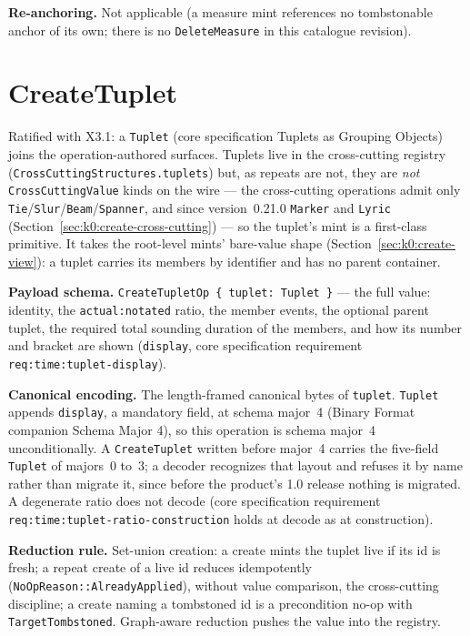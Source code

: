 \documentclass[11pt,letterpaper]{report}
\newcommand{\sectionsc}[1]{{\addfontfeatures{Letters=SmallCaps}#1}}
\newcounter{requirement}[chapter]
\begin{document}
\textbf{Re-anchoring.} Not applicable (a measure mint references no
tombstonable anchor of its own; there is no \texttt{DeleteMeasure} in this
catalogue revision).

\section{CreateTuplet}
\label{sec:k0:create-tuplet}

Ratified with X3.1: a \texttt{Tuplet} (core specification
\sectionsc{Tuplets as Grouping Objects}) joins the operation-authored
surfaces. Tuplets live in the cross-cutting registry
(\texttt{CrossCuttingStructures.tuplets}) but, as repeats are not, they are
\emph{not} \texttt{CrossCuttingValue} kinds on the wire --- the cross-cutting
operations admit only \texttt{Tie}/\texttt{Slur}/\texttt{Beam}/\texttt{Spanner},
and since version~0.21.0 \texttt{Marker} and \texttt{Lyric}
(Section~\ref{sec:k0:create-cross-cutting}) --- so the tuplet's mint is a
first-class primitive. It takes the root-level mints' bare-value shape
(Section~\ref{sec:k0:create-view}): a tuplet carries its members by
identifier and has no parent container.

\textbf{Payload schema.} \texttt{CreateTupletOp \{ tuplet: Tuplet \}} --- the
full value: identity, the \texttt{actual:notated} ratio, the member events,
the optional parent tuplet, the required total sounding duration of the
members, and how its number and bracket are shown (\texttt{display}, core
specification requirement \texttt{req:time:tuplet-display}).

\textbf{Canonical encoding.} The length-framed canonical bytes of
\texttt{tuplet}. \texttt{Tuplet} appends \texttt{display}, a mandatory field,
at schema major~4 (Binary Format companion \sectionsc{Schema Major 4}), so
this operation is schema major~4 unconditionally. A \texttt{CreateTuplet}
written before major~4 carries the five-field \texttt{Tuplet} of majors~0
to~3; a decoder recognizes that layout and refuses it by name rather than
migrate it, since before the product's 1.0 release nothing is migrated. A
degenerate ratio does not decode (core specification
requirement \texttt{req:time:tuplet-ratio-construction} holds at decode as at
construction).

\textbf{Reduction rule.} Set-union creation: a create mints the tuplet live
if its id is fresh; a repeat create of a live id reduces idempotently
(\texttt{NoOpReason::AlreadyApplied}), without value comparison, the
cross-cutting discipline; a create naming a tombstoned id is a precondition
no-op with \texttt{TargetTombstoned}. Graph-aware reduction pushes the value
into the registry.
\end{document}
